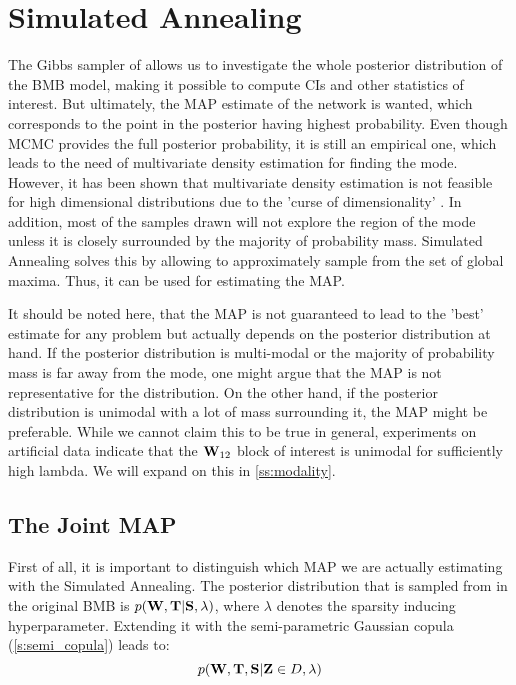 \section{Simulated Annealing}
The Gibbs sampler of \cite{kaufmann_bayesian_2015} allows us to investigate the whole posterior distribution of the \gls{BMB} model, making it possible to compute \gls{CI}s and other statistics of interest.
But ultimately, the \gls{MAP} estimate of the network is wanted, which corresponds to the point in the posterior having highest probability.
Even though MCMC provides the full posterior probability, it is still an empirical one, which leads to the need of multivariate density estimation for finding the mode.
However, it has been shown that multivariate density estimation is not feasible for high dimensional distributions due to the 'curse of dimensionality' \citep{scott1991feasibility}.
In addition, most of the samples drawn will not explore the region of the mode unless it is closely surrounded by the majority of probability mass.
Simulated Annealing solves this by allowing to approximately sample from the set of global maxima.
Thus, it can be used for estimating the \gls{MAP}.

It should be noted here, that the \gls{MAP} is not guaranteed to lead to the 'best' estimate for any problem but actually depends on the posterior distribution at hand.
If the posterior distribution is multi-modal or the majority of probability mass is far away from the mode, one might argue that the \gls{MAP} is not representative for the distribution. 
On the other hand, if the posterior distribution is unimodal with a lot of mass surrounding it, the \gls{MAP} might be preferable.
While we cannot claim this to be true in general,
experiments on artificial data indicate that the $\mathbf{W}_{12}$ block of interest is unimodal for sufficiently high lambda.
We will expand on this in \autoref{ss:modality}.

\subsection{The Joint MAP}
\label{ss:joint_map}
First of all, it is important to distinguish which MAP we are actually estimating with the Simulated Annealing.
The posterior distribution that is sampled from in the original \gls{BMB} 
is
$
p(\mathbf{W}, \mathbf{T}| \mathbf{S}, \lambda)
$,
where $\lambda$ denotes the sparsity inducing hyperparameter.
Extending it with the semi-parametric Gaussian copula (\autoref{s:semi_copula}) leads to:
\begin{equation}
p(\mathbf{W}, \mathbf{T}, \mathbf{S} |\mathbf{Z}\in D, \lambda)
\end{equation}

